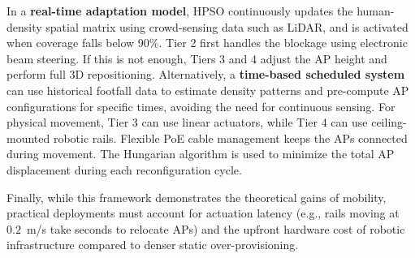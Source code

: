 \documentclass[conference]{IEEEtran}
\begin{document}
	
	
	
	
	In a \textbf{real-time adaptation model}, HPSO continuously updates the human-density spatial matrix using crowd-sensing data such as LiDAR, and is activated when coverage falls below 90\%. Tier 2 first handles the blockage using electronic beam steering. If this is not enough, Tiers 3 and 4 adjust the AP height and perform full 3D repositioning. Alternatively, a \textbf{time-based scheduled system} can use historical footfall data to estimate density patterns and pre-compute AP configurations for specific times, avoiding the need for continuous sensing. For physical movement, Tier 3 can use linear actuators, while Tier 4 can use ceiling-mounted robotic rails. Flexible PoE cable management keeps the APs connected during movement. The Hungarian algorithm is used to minimize the total AP displacement during each reconfiguration cycle.

	Finally, while this framework demonstrates the theoretical gains of mobility, practical deployments must account for actuation latency (e.g., rails moving at $0.2$~m/s take seconds to relocate APs) and the upfront hardware cost of robotic infrastructure compared to denser static over-provisioning.
	
\end{document}

